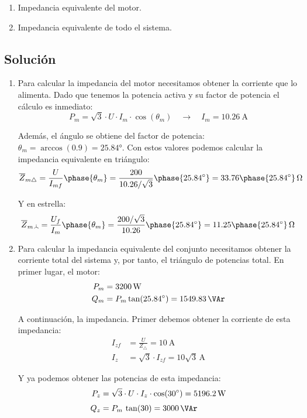 \begin{enumerate}
\item Impedancia equivalente del motor.
\item Impedancia equivalente de todo el sistema.
\end{enumerate}

\subsection*{Solución}

\begin{enumerate}
\item Para calcular la impedancia del motor necesitamos obtener la corriente que lo alimenta. Dado que tenemos la potencia activa y su factor de potencia el cálculo es inmediato:
  \[
    P_m = \sqrt{3} \cdot U \cdot I_m \cdot \cos(\theta_m) \quad\rightarrow\quad I_m = \qty{10.26}{\ampere}
  \]
  
Además, el ángulo se obtiene del factor de potencia: $\theta_m = \arccos(0.9) = \ang{25.84}$.
  Con estos valores podemos calcular la impedancia equivalente en triángulo:
  \[
    \overline{Z}_{m\triangle} = \frac{U}{I_{mf}}\phase{\theta_m} = \frac{200}{10.26/\sqrt{3}}\phase{\ang{25.84}} = 33.76\phase{\ang{25.84}}\,\unit{\ohm}
  \]

  Y en estrella:
\[
  \overline{Z}_{m\wye} = \frac{U_f}{I_{m}}\phase{\theta_m} = \frac{200/\sqrt{3}}{10.26}\phase{\ang{25.84}} = 11.25\phase{\ang{25.84}}\,\unit{\ohm}
  \]
 
\item Para calcular la impedancia equivalente del conjunto necesitamos obtener la corriente total del sistema y, por tanto, el triángulo de potencias total. En primer lugar, el motor:
  \begin{align*}
    P_m &= \qty{3200}{\watt}\\
    Q_m &= P_m \tan(25.84^\circ) = \qty{1549.83}{\VAr}
  \end{align*}

  A continuación, la impedancia. Primer debemos obtener la corriente de esta impedancia:
  \begin{align*}
    I_{zf} &= \frac{U}{Z_\triangle} = \qty{10}{\ampere}\\[3pt]
    I_z &= \sqrt{3}\cdot I_{zf} = 10\sqrt{3}\,\unit{\ampere}
  \end{align*}
  
  Y ya podemos obtener las potencias de esta impedancia:
  \begin{align*}
    P_z &= \sqrt{3}\cdot U \cdot I_z \cdot \cos(\ang{30}) = \qty{5196.2}{\watt}\\[3pt]
    Q_z &= P_m \, \tan(30) = \qty{3000}{\VAr}
  \end{align*}


\end{enumerate}
